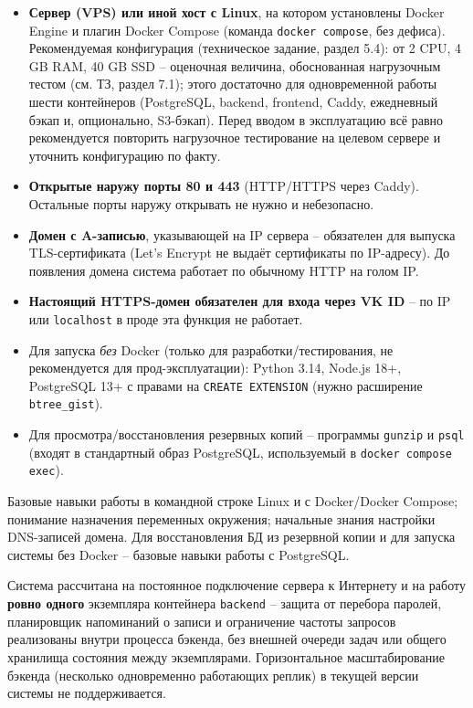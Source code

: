 \begin{itemize}
  \item \textbf{Сервер (VPS) или иной хост с Linux}, на котором установлены
        Docker Engine и плагин Docker Compose (команда \texttt{docker
        compose}, без дефиса). Рекомендуемая конфигурация (техническое
        задание, раздел 5.4): от 2 CPU, 4 GB RAM, 40 GB SSD -- оценочная
        величина, обоснованная нагрузочным тестом (см. ТЗ, раздел 7.1);
        этого достаточно для одновременной работы шести контейнеров
        (PostgreSQL, backend, frontend, Caddy, ежедневный бэкап и,
        опционально, S3-бэкап). Перед вводом в эксплуатацию всё равно
        рекомендуется повторить нагрузочное тестирование на целевом
        сервере и уточнить конфигурацию по факту.
  \item \textbf{Открытые наружу порты 80 и 443} (HTTP/HTTPS через Caddy).
        Остальные порты наружу открывать не нужно и небезопасно.
  \item \textbf{Домен с A-записью}, указывающей на IP сервера -- обязателен
        для выпуска TLS-сертификата (Let's Encrypt не выдаёт сертификаты
        по IP-адресу). До появления домена система работает по обычному
        HTTP на голом IP.
  \item \textbf{Настоящий HTTPS-домен обязателен для входа через VK ID} --
        по IP или \texttt{localhost} в проде эта функция не работает.
  \item Для запуска \emph{без} Docker (только для разработки/тестирования,
        не рекомендуется для прод-эксплуатации): Python 3.14, Node.js 18+,
        PostgreSQL 13+ с правами на \texttt{CREATE EXTENSION} (нужно
        расширение \texttt{btree\_gist}).
  \item Для просмотра/восстановления резервных копий -- программы
        \texttt{gunzip} и \texttt{psql} (входят в стандартный образ
        PostgreSQL, используемый в \texttt{docker compose exec}).
\end{itemize}


Базовые навыки работы в командной строке Linux и с Docker/Docker Compose;
понимание назначения переменных окружения; начальные знания настройки
DNS-записей домена. Для восстановления БД из резервной копии и для
запуска системы без Docker -- базовые навыки работы с PostgreSQL.


Система рассчитана на постоянное подключение сервера к Интернету и на
работу \textbf{ровно одного} экземпляра контейнера \texttt{backend} --
защита от перебора паролей, планировщик напоминаний о записи и
ограничение частоты запросов реализованы внутри процесса бэкенда, без
внешней очереди задач или общего хранилища состояния между экземплярами.
Горизонтальное масштабирование бэкенда (несколько одновременно
работающих реплик) в текущей версии системы не поддерживается.

